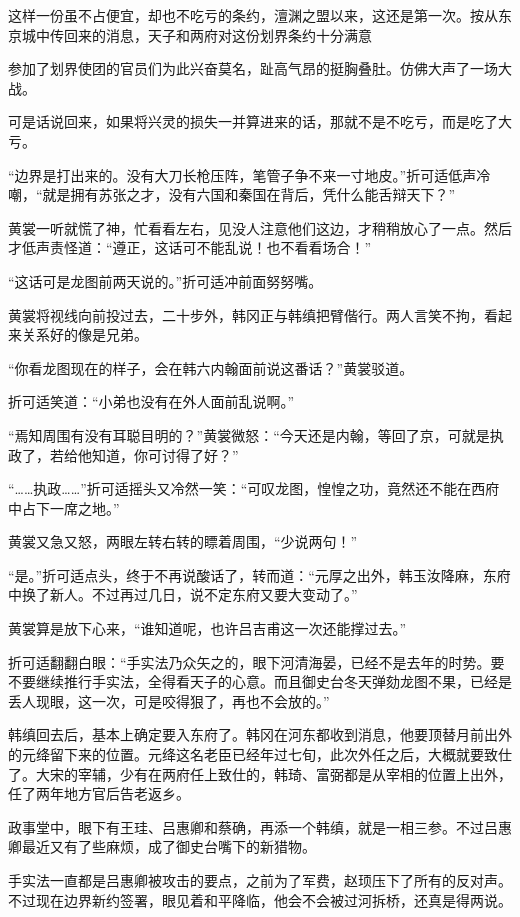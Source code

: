 这样一份虽不占便宜，却也不吃亏的条约，澶渊之盟以来，这还是第一次。按从东京城中传回来的消息，天子和两府对这份划界条约十分满意

参加了划界使团的官员们为此兴奋莫名，趾高气昂的挺胸叠肚。仿佛大声了一场大战。

可是话说回来，如果将兴灵的损失一并算进来的话，那就不是不吃亏，而是吃了大亏。

“边界是打出来的。没有大刀长枪压阵，笔管子争不来一寸地皮。”折可适低声冷嘲，“就是拥有苏张之才，没有六国和秦国在背后，凭什么能舌辩天下？”

黄裳一听就慌了神，忙看看左右，见没人注意他们这边，才稍稍放心了一点。然后才低声责怪道：“遵正，这话可不能乱说！也不看看场合！”

“这话可是龙图前两天说的。”折可适冲前面努努嘴。

黄裳将视线向前投过去，二十步外，韩冈正与韩缜把臂偕行。两人言笑不拘，看起来关系好的像是兄弟。

“你看龙图现在的样子，会在韩六内翰面前说这番话？”黄裳驳道。

折可适笑道：“小弟也没有在外人面前乱说啊。”

“焉知周围有没有耳聪目明的？”黄裳微怒：“今天还是内翰，等回了京，可就是执政了，若给他知道，你可讨得了好？”

“……执政……”折可适摇头又冷然一笑：“可叹龙图，惶惶之功，竟然还不能在西府中占下一席之地。”

黄裳又急又怒，两眼左转右转的瞟着周围，“少说两句！”

“是。”折可适点头，终于不再说酸话了，转而道：“元厚之出外，韩玉汝降麻，东府中换了新人。不过再过几日，说不定东府又要大变动了。”

黄裳算是放下心来，“谁知道呢，也许吕吉甫这一次还能撑过去。”

折可适翻翻白眼：“手实法乃众矢之的，眼下河清海晏，已经不是去年的时势。要不要继续推行手实法，全得看天子的心意。而且御史台冬天弹劾龙图不果，已经是丢人现眼，这一次，可是咬得狠了，再也不会放的。”

韩缜回去后，基本上确定要入东府了。韩冈在河东都收到消息，他要顶替月前出外的元绛留下来的位置。元绛这名老臣已经年过七旬，此次外任之后，大概就要致仕了。大宋的宰辅，少有在两府任上致仕的，韩琦、富弼都是从宰相的位置上出外，任了两年地方官后告老返乡。

政事堂中，眼下有王珪、吕惠卿和蔡确，再添一个韩缜，就是一相三参。不过吕惠卿最近又有了些麻烦，成了御史台嘴下的新猎物。

手实法一直都是吕惠卿被攻击的要点，之前为了军费，赵顼压下了所有的反对声。不过现在边界新约签署，眼见着和平降临，他会不会被过河拆桥，还真是得两说。

